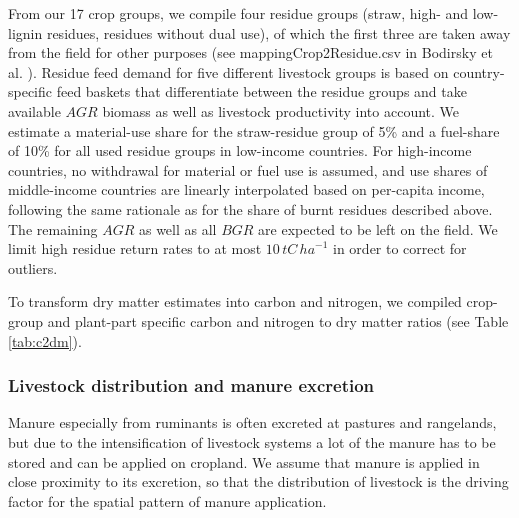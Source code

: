 \documentclass[gc, manuscript]{copernicus}
\begin{document}
From our 17 crop groups, we compile four residue groups (straw, high- and low-lignin residues, residues without dual use), of which the first three are taken away from the field for other purposes (see mappingCrop2Residue.csv in Bodirsky et al. \citeyearpar{bodirsky_mrcommons_2020}). Residue feed demand for five different livestock groups is based on country-specific feed baskets \citep[see][]{weindl_livestock_2017} that differentiate between the residue groups and take available \(AGR\) biomass as well as livestock productivity into account. We estimate a material-use share for the straw-residue group of 5\% and a fuel-share of 10\% for all used residue groups in low-income countries. For high-income countries, no withdrawal for material or fuel use is assumed, and use shares of middle-income countries are linearly interpolated based on per-capita income, following the same rationale as for the share of burnt residues described above. The remaining \(AGR\) as well as all \(BGR\) are expected to be left on the field. We limit high residue return rates to at most \(10\,\unit{tC\,ha}^{-1}\) in order to correct for outliers.

To transform dry matter estimates into carbon and nitrogen, we compiled crop-group and plant-part specific carbon and nitrogen to dry matter ratios (see Table \ref{tab:c2dm}).

\hypertarget{sec:livstmanure}{%
\subsubsection{Livestock distribution and manure excretion}\label{sec:livstmanure}}

Manure especially from ruminants is often excreted at pastures and rangelands, but due to the intensification of livestock systems a lot of the manure has to be stored and can be applied on cropland. We assume that manure is applied in close proximity to its excretion, so that the distribution of livestock is the driving factor for the spatial pattern of manure application.
\end{document}
